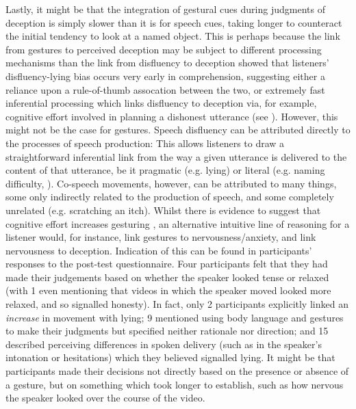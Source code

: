 \documentclass[a4paper,man,natbib]{apa6}
\begin{document}
Lastly, it might be that the integration of gestural cues during judgments of deception is simply slower than it is for speech cues, taking longer to counteract the initial tendency to look at a named object. 
This is perhaps because the link from gestures to perceived deception may be subject to different processing mechanisms than the link from disfluency to deception %
\citet{Loy2017} showed that listeners' disfluency-lying bias occurs very early in comprehension, suggesting either a reliance upon a rule-of-thumb assocation between the two, or extremely fast inferential processing which links disfluency to deception via, for example, cognitive effort involved in planning a dishonest utterance (see \citealt{King2018}).
However, this might not be the case for gestures.
Speech disfluency can be attributed directly to the processes of speech production: This allows listeners to draw a straightforward inferential link from the way a given utterance is delivered to the content of that utterance, be it pragmatic (e.g. lying) or literal (e.g. naming difficulty, \citealt[cf.][]{Arnold2007}). %
Co-speech movements, however, can be attributed to many things, some only indirectly related to the production of speech, and some completely unrelated (e.g. scratching an itch).
Whilst there is evidence to suggest that cognitive effort increases gesturing \citep{Goldin-Meadow2001}, an alternative intuitive line of reasoning for a listener would, for instance, link gestures to nervousness/anxiety, and link nervousness to deception.
Indication of this can be found in participants' responses to the post-test questionnaire. 
Four participants felt that they had made their judgements based on whether the speaker looked tense or relaxed (with 1 even mentioning that videos in which the speaker moved looked more relaxed, and so signalled honesty).
In fact, only 2 participants explicitly linked an \textit{increase} in movement with lying; 9 mentioned using body language and gestures to make their judgments but specified neither rationale nor direction; and 15 described perceiving differences in spoken delivery (such as in the speaker's intonation or hesitations) which they believed signalled lying. 
It might be that participants made their decisions not directly based on the presence or absence of a gesture, but on something which took longer to establish, such as how nervous the speaker looked over the course of the video.
\end{document}
